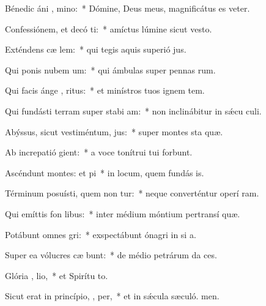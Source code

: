\item Bénedic áni , mino:~* Dómine, Deus meus, magnificátus es veter.
\item Confessiónem, et decó ti:~* amíctus lúmine sicut vesto.
\item Exténdens cæ  lem:~* qui tegis aquis superió jus.
\item Qui ponis nubem  um:~* qui ámbulas super pennas rum.
\item Qui facis ánge , ritus:~* et minístros tuos ignem tem.
\item Qui fundásti terram super stabi am:~* non inclinábitur in sǽcu culi.
\item Abýssus, sicut vestiméntum,  jus:~* super montes sta quæ.
\item Ab increpatió  gient:~* a voce tonítrui tui forbunt.
\item Ascéndunt montes: et  pi~* in locum, quem fundás is.
\item Términum posuísti, quem non tur:~* neque converténtur operí ram.
\item Qui emíttis fon  libus:~* inter médium móntium pertransí quæ.
\item Potábunt omnes  gri:~* exspectábunt ónagri in si a.
\item Super ea vólucres cæ bunt:~* de médio petrárum da ces.
\item Glória ,  lio,~* et Spirítu to.
\item Sicut erat in princípio,  ,  per,~* et in sǽcula sæculó. men.
